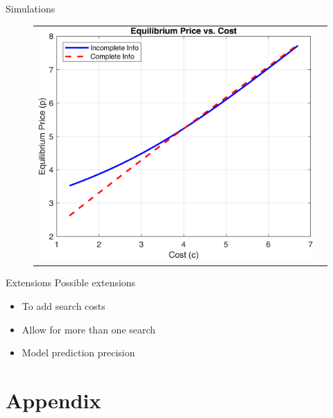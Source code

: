 \documentclass[10pt,aspectratio=169]{beamer}
\begin{document}
\begin{frame}{Simulations }
\begin{figure}[H]
\centering{}%
\begin{tabular}{cc}
\includegraphics[scale=0.7]{../figures/simulations/model5/pricesCI_IC.png}
\end{tabular}
\end{figure}
\end{frame}

\begin{frame}{Extensions}
Possible extensions
\begin{itemize}
    \item To add search costs
    \item Allow for more than one search 
    \item Model prediction precision 
\end{itemize}
\end{frame}


\section{Appendix}
\end{document}
